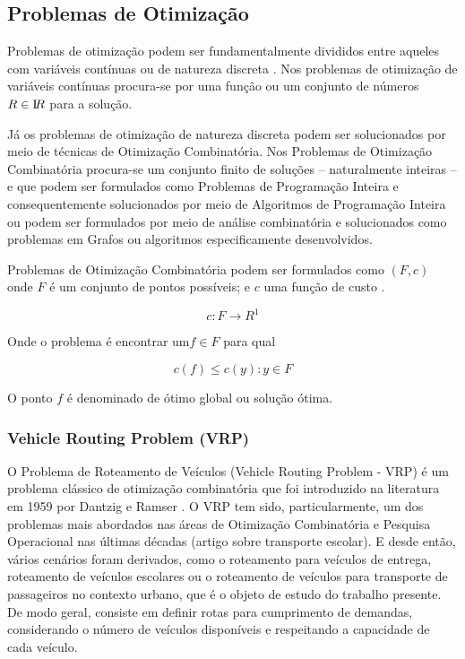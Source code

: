 \subsection{Problemas de Otimização}\label{problemas-de-otimizacao}

Problemas de otimização podem ser fundamentalmente divididos entre aqueles com variáveis contínuas ou de natureza discreta \cite{combinatorial-optimization}. Nos problemas de otimização de variáveis contínuas procura-se por uma função ou um conjunto de números \(R \in \textrm I\!R \) para a solução.

Já os problemas de otimização de natureza discreta podem ser solucionados por meio de técnicas de Otimização Combinatória. Nos Problemas de Otimização Combinatória procura-se um conjunto finito de soluções -- naturalmente inteiras -- e que podem ser formulados como Problemas de Programação Inteira e consequentemente solucionados por meio de Algoritmos de Programação Inteira \cite{goldbarg} ou podem ser formulados por meio de análise combinatória e solucionados como problemas em Grafos ou algoritmos especificamente desenvolvidos.


Problemas de Otimização Combinatória podem ser formulados como \((F, c)\) onde \(F\) é um conjunto de pontos possíveis; e \(c\) uma função de custo \cite{rodolfo}.

\[c: F \longrightarrow R^1 \]

Onde o problema é encontrar um\(f \in F\) para qual

\[c(f) \leq c(y): y \in F \]

O ponto \(f\) é denominado de ótimo global ou solução ótima.

\subsubsection{Vehicle Routing Problem (VRP)} \label{vrp}

O Problema de Roteamento de Veículos (Vehicle Routing Problem - VRP) é um problema clássico de otimização combinatória que foi introduzido na literatura em 1959 por Dantzig e Ramser \cite{toth}. O VRP tem sido, particularmente, um dos problemas mais abordados nas áreas de Otimização Combinatória e Pesquisa Operacional nas últimas décadas (artigo sobre transporte escolar). E desde então, vários cenários foram derivados, como o roteamento para veículos de entrega, roteamento de veículos escolares ou o roteamento de veículos para transporte de passageiros no contexto urbano, que é o objeto de estudo do trabalho presente. De modo geral, consiste em definir rotas para cumprimento de demandas, considerando o número de veículos disponíveis e respeitando a capacidade de cada veículo.

